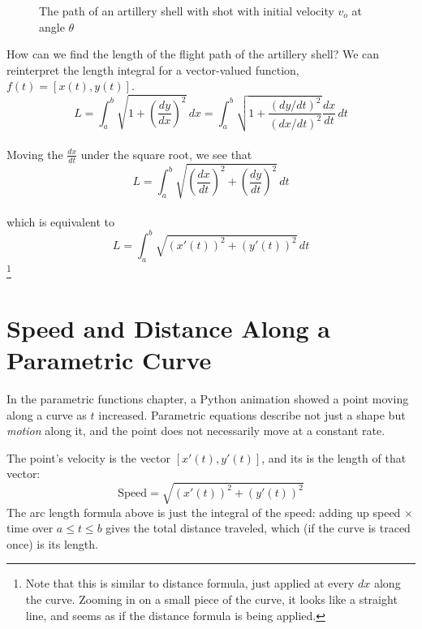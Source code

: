 \begin{figure}[H]
\centering
    \caption{The path of an artillery shell with shot with initial 
    velocity $v_o$ at angle $\theta$}
    \label{fig:shell}
\end{figure}  

How can we find the length of the flight path of the artillery shell? 
We can reinterpret the length integral for a vector-valued function, 
$f(t) = [x(t), y(t)]$.  
$$L = \int_a^b \sqrt{1+(\frac{dy}{dx})^2}\,dx = 
\int_a^b \sqrt{1 + \frac{(dy/dt)^2}{(dx/dt)^2}}\frac{dx}{dt}\,dt$$\\
Moving the $\frac{dx}{dt}$ under the square root, we see that
$$L = \int_a^b \sqrt{(\frac{dx}{dt})^2 + (\frac{dy}{dt})^2}\,dt$$\\
which is equivalent to 
$$L = \int_a^b \sqrt{(x'(t))^2 + (y'(t))^2}\,dt$$\footnote{Note that this is similar to distance formula, just applied at every $dx$ along the curve. Zooming in on a small piece of the curve, it looks like a straight line, and seems as if the distance formula is being applied.}

\section{Speed and Distance Along a Parametric Curve}
In the parametric functions chapter, a Python animation showed a point
moving along a curve as $t$ increased. Parametric equations describe not
just a shape but \emph{motion} along it, and the point does not
necessarily move at a constant rate.

The point's velocity is the vector $[x'(t), y'(t)]$, and its
 is the length of that
vector:
\begin{equation*}
    \text{Speed} = \sqrt{(x'(t))^2 + (y'(t))^2}
\end{equation*}
The arc length formula above is just the
integral of the speed: adding up speed $\times$ time over $a \le t \le b$
gives the total distance traveled, which (if the curve is traced once) is
its length.

